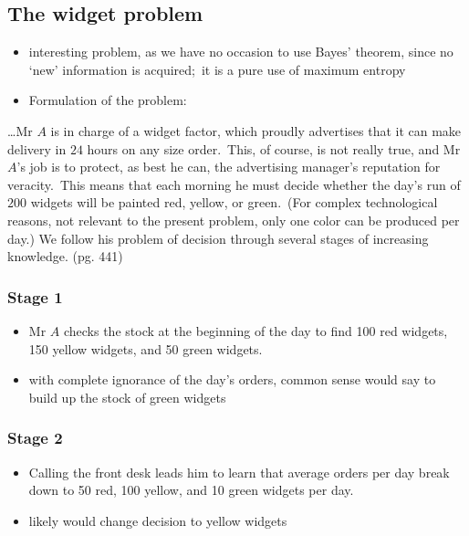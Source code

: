 \documentclass[../jaynes_prob_theory_notes.tex]{subfiles}
\begin{document}
        \subsection{The widget problem}
            \begin{itemize} 
                \item interesting problem, as we have no occasion to use Bayes' theorem, since no `new' information is acquired;\ it is a pure use of maximum entropy
                \item Formulation of the problem:
            \end{itemize}
                    \begin{displayquote}
                        \ldots Mr \(A\) is in charge of a widget factor, which proudly advertises that it can make delivery in \(24\) hours on any size order.\ This, of course, is not really true, and Mr \(A\)'s job is to protect, as best he can, the advertising manager's reputation for veracity.\ This means that each morning he must decide whether the day's run of \(200\) widgets will be painted red, yellow, or green.\ (For complex technological reasons, not relevant to the present problem, only one color can be produced per day.) We follow his problem of decision through several stages of increasing knowledge. (pg. 441)
                    \end{displayquote}
                
                \subsubsection{Stage 1}
                    \begin{itemize} 
                        \item Mr \(A\) checks the stock at the beginning of the day to find 100 red widgets, 150 yellow widgets, and 50 green widgets.
                        \item with complete ignorance of the day's orders, common sense would say to build up the stock of green widgets
                    \end{itemize}
                
                \subsubsection{Stage 2}
                    \begin{itemize} 
                        \item Calling the front desk leads him to learn that average orders per day break down to 50 red, 100 yellow, and 10 green widgets per day.
                        \item likely would change decision to yellow widgets
                    \end{itemize}
\end{document}
